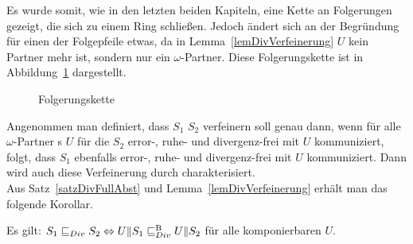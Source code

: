 Es wurde somit, wie in den letzten beiden Kapiteln, eine Kette an Folgerungen
gezeigt, die sich zu einem Ring schließen. Jedoch ändert sich an der Begründung
für einen der Folgepfeile etwas, da in Lemma~\ref{lemDivVerfeinerung} $U$ kein
Partner mehr ist, sondern nur ein $\omega$-Partner. Diese Folgerungskette ist in
Abbildung~\ref{FolgerungsketteDiv} dargestellt.

\begin{figure}[h!tbp]
  \begin{center}
    \caption{Folgerungskette}
\label{FolgerungsketteDiv}
  \end{center}
\end{figure}

Angenommen man definiert, dass $S_1$ $S_2$ verfeinern
soll genau dann, wenn für alle $\omega$-Partner \EIO{}s $U$ für die $S_2$ error-,
ruhe- und divergenz-frei mit $U$ kommuniziert, folgt, dass $S_1$ ebenfalls
error-, ruhe- und divergenz-frei mit $U$ kommuniziert. Dann wird auch diese
Verfeinerung durch \DRel{} charakterisiert.\\
Aus Satz~\ref{satzDivFullAbst} und Lemma~\ref{lemDivVerfeinerung} erhält man
das folgende Korollar.

\begin{kor}
  Es gilt: $S_1\sqsubseteq _{Div}{} S_2 \Leftrightarrow U\|S_1\sqsubseteq _{Div}^\mathrm{B}{} U\|S_2$ für alle
  komponierbaren $U$.
\end{kor}

